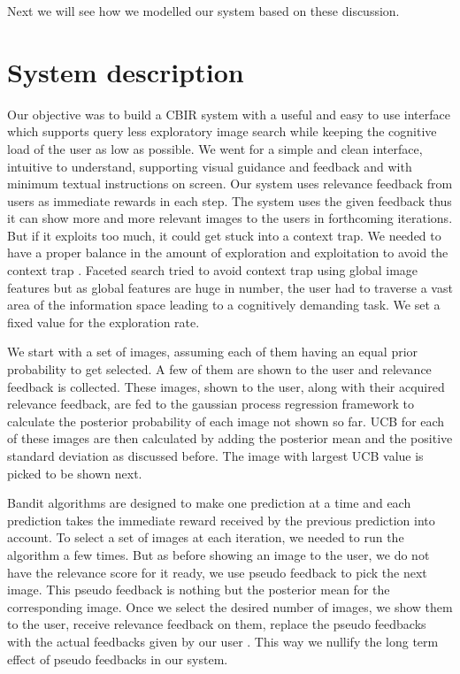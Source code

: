 \documentclass[english]{tktltiki}
\begin{document}
Next we will see how we modelled our system based on these discussion.



\section{System description}

Our objective was to build a CBIR system with a useful and easy to use interface which supports query less exploratory image search \cite{pichunter, PicSOM, iter_rel_feed} while keeping the cognitive load of the user as low as possible. We went for a simple and clean interface, intuitive to understand, supporting visual guidance and feedback and with minimum textual instructions on screen. Our system uses relevance feedback from users as immediate rewards in each step. The system uses the given feedback thus it can show more and more relevant images to the users in forthcoming iterations. But if it exploits too much, it could get stuck into a context trap. We needed to have a proper balance in the amount of exploration and exploitation to avoid the context trap \cite{dir_expl_search, cbir_multinomial_rel_feed, iter_rel_feed}. Faceted search \cite{faceted_search_1, faceted_search_2} tried to avoid context trap using global image features but as global features are huge in number, the user had to traverse a vast area of the information space \cite{info_space} leading to a cognitively demanding task. We set a fixed value for the exploration rate.

We start with a set of images, assuming each of them having an equal prior probability to get selected. A few of them are shown to the user and relevance feedback is collected. These images, shown to the user, along with their acquired relevance feedback, are fed to the gaussian process regression framework to calculate the posterior probability of each image not shown so far. UCB for each of these images are then calculated by adding the posterior mean and the positive standard deviation as discussed before. The image with largest UCB value is picked to be shown next.


Bandit algorithms are designed to make one prediction at a time and each prediction takes the immediate reward received by the previous prediction into account. To select a set of images at each iteration, we needed to run the algorithm a few times. But as before showing an image to the user, we do not have the relevance score for it ready, we use pseudo feedback to pick the next image. This pseudo feedback is nothing but the posterior mean for the corresponding image. Once we select the desired number of images, we show them to the user, receive relevance feedback on them, replace the pseudo feedbacks with the actual feedbacks given by our user \cite{imse}. This way we nullify the long term effect of pseudo feedbacks in our system.
\end{document}
